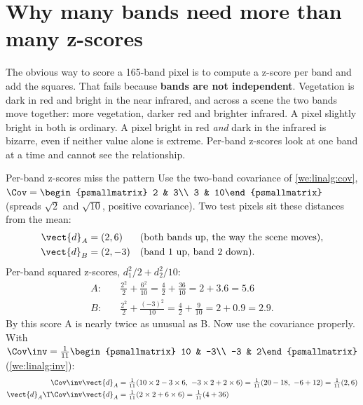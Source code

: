 \section{Why many bands need more than many z-scores}\label{sec:rx:whynotz}

The obvious way to score a 165-band pixel is to compute a z-score per band and add the squares.
That fails because \textbf{bands are not independent}. Vegetation is dark in red and bright in the
near infrared, and across a scene the two bands move together: more vegetation, darker red and
brighter infrared. A pixel slightly bright in both is ordinary. A pixel bright in red \emph{and}
dark in the infrared is bizarre, even if neither value alone is extreme. Per-band z-scores look at
one band at a time and cannot see the relationship.

\begin{worked}[label={we:rx:zfail}]{Per-band z-scores miss the pattern}
Use the two-band covariance of \cref{we:linalg:cov}, $\Cov = \begin{psmallmatrix} 2 & 3\\ 3 &
10\end{psmallmatrix}$ (spreads $\sqrt2$ and $\sqrt{10}$, positive covariance). Two test pixels sit
these distances from the mean:
\begin{align*}
\vect{d}_A &= (2, 6) && \text{(both bands up, the way the scene moves)},\\
\vect{d}_B &= (2, -3) && \text{(band 1 up, band 2 down)}.
\end{align*}
Per-band squared z-scores, $d_1^2/2 + d_2^2/10$:
\begin{align*}
A:&\quad \frac{2^2}{2} + \frac{6^2}{10} = \frac42 + \frac{36}{10} = 2 + 3.6 = 5.6\\
B:&\quad \frac{2^2}{2} + \frac{(-3)^2}{10} = \frac42 + \frac{9}{10} = 2 + 0.9 = 2.9 .
\end{align*}
By this score A is nearly twice as unusual as B. Now use the covariance properly. With
$\Cov\inv = \frac{1}{11}\begin{psmallmatrix} 10 & -3\\ -3 & 2\end{psmallmatrix}$ (\cref{we:linalg:inv}):
\begin{align*}
\Cov\inv\vect{d}_A &= \tfrac{1}{11}(10\times2 - 3\times6,\ -3\times2 + 2\times6)
  = \tfrac{1}{11}(20 - 18,\ -6 + 12) = \tfrac{1}{11}(2, 6)\\
\vect{d}_A\T\Cov\inv\vect{d}_A &= \tfrac{1}{11}(2\times2 + 6\times6) = \tfrac{1}{11}(4 + 36)

\end{align*}
\end{worked}
